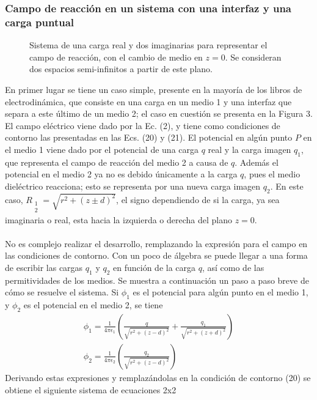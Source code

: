 \documentclass[12pt, notitlepage]{article}
\numberwithin{equation}{section}
\begin{document}
\subsubsection{Campo de reacción en un sistema con una interfaz y una carga puntual}
\begin{figure}[H]
	\centering
	
	\caption{Sistema de una carga real y dos imaginarias para representar el campo de reacción, con el cambio de medio en $z=0$. Se consideran dos espacios semi-infinitos a partir de este plano.}
\end{figure}
En primer lugar se tiene un caso simple, presente en la mayoría de los libros de electrodinámica, que consiste en una carga en un medio 1 y una interfaz que separa a este último de un medio 2; el caso en cuestión se presenta en la Figura 3. El campo eléctrico viene dado por la Ec. (2), y tiene como condiciones de contorno las presentadas en las Ecs. (20) y (21).
El potencial en algún punto $P$ en el medio 1 viene dado por el potencial de una carga $q$ real y la carga imagen $q_1$, que representa el campo de reacción del medio 2 a causa de $q$. Además el potencial en el medio 2 ya no es debido únicamente a la carga $q$, pues el medio dieléctrico reacciona; esto se representa por una nueva carga imagen $q_2$. En este caso, $R_{\substack{1\\2}} = \sqrt{r^2 + (z\pm d)^2}$, el signo dependiendo de si la carga, ya sea imaginaria o real, esta hacia la izquierda o derecha del plano $z=0$.\\\\
No es complejo realizar el desarrollo, remplazando la expresión para el campo en las condiciones de contorno. Con un poco de álgebra se puede llegar a una forma de escribir las cargas $q_1$ y $q_2$ en función de la carga $q$, así como de las permitividades de los medios. Se muestra a continuación un paso a paso breve de cómo se resuelve el sistema. Si $\phi_1$ es el potencial para algún punto en el medio 1, y $\phi_2$ es el potencial en el medio 2, se tiene
\begin{gather}
\phi_1 = \frac{1}{4\pi\epsilon_1}\left(\frac{q}{\sqrt{r^2+(z-d)^2}}+\frac{q_1}{\sqrt{r^2+(z+d)^2}}\right)\\
\phi_2 = \frac{1}{4\pi\epsilon_2}\left(\frac{q_2}{\sqrt{r^2+(z-d)^2}}\right)
\end{gather}
Derivando estas expresiones y remplazándolas en la condición de contorno (20) se obtiene el siguiente sistema de ecuaciones 2x2\\
\end{document}
